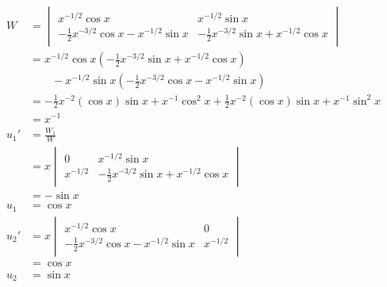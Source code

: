 \documentclass{article}
\begin{document}
\begin{align*}
  W    & = \begin{vmatrix}
             x^{-1 / 2} \cos x                                  & x^{-1 / 2} \sin x                                   \\
             -\frac{1}{2} x^{-3 / 2} \cos x - x^{-1 / 2} \sin x & - \frac{1}{2} x^{-3 / 2} \sin x + x^{-1 / 2} \cos x
           \end{vmatrix}     \\
       & = x^{-1 / 2} \cos x \left( -\frac{1}{2} x^{-3 / 2} \sin x + x^{-1 / 2} \cos x \right)                          \\
       & \qquad -x^{-1 / 2} \sin x \left( -\frac{1}{2} x^{-3 / 2} \cos x - x^{-1 / 2} \sin x \right)                    \\
       & = -\frac{1}{2} x^{-2} (\cos x) \sin x + x^{-1} \cos^2 x + \frac{1}{2} x^{-2} (\cos x) \sin x + x^{-1} \sin^2 x \\
       & = x^{-1}                                                                                                       \\
  u_1' & = \frac{W_1}{W}                                                                                                \\
       & = x \begin{vmatrix}
               0          & x^{-1 / 2} \sin x                                  \\
               x^{-1 / 2} & -\frac{1}{2} x^{-3 / 2} \sin x + x^{-1 / 2} \cos x
             \end{vmatrix}                                            \\
       & = -\sin x                                                                                                      \\
  u_1  & = \cos x                                                                                                       \\
  u_2' & = x \begin{vmatrix}
               x^{-1 / 2} \cos x                                  & 0          \\
               -\frac{1}{2} x^{-3 / 2} \cos x - x^{-1 / 2} \sin x & x^{-1 / 2}
             \end{vmatrix}                                            \\
       & = \cos x                                                                                                       \\
  u_2  & = \sin x
\end{align*}
\end{document}
